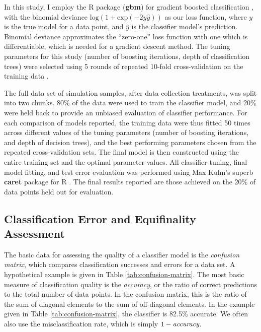 In this study, I employ the R package (\textbf{gbm}) for gradient
boosted classification \citep{ridgeway1999state}, with the binomial deviance \(\textrm{log}(1 + \textrm{exp}(-2y\hat{y}))\) as our loss function, where \(y\) is the true
model for a data point, and \(\hat{y}\) is the classifier model's
prediction.  Binomial deviance approximates the ``zero-one'' loss function with one which is differentiable, which is needed for a gradient descent method.  The tuning parameters for this study (number of boosting iterations, depth of classification trees) were selected using 5 rounds of repeated 10-fold cross-validation on the training data \citep{Kim:2009im, kuhn2013applied}.

The full data set of simulation samples, after data collection treatments, was split into two chunks. 80\% of the data were
used to train the classifier model, and 20\% were held back to provide an
unbiased evaluation of classifier performance.  For each comparison of models
reported, the training data were thus fitted 50 times across
different values of the tuning parameters (number of boosting
iterations, and depth of decision trees), and the best performing
parameters chosen from the repeated cross-validation sets. The final model is then constructed using the entire
training set and the optimal parameter values. All classifier tuning,
final model fitting, and test error evaluation was performed using Max
Kuhn's superb \textbf{caret} package for R
\citep{kuhn2008building, kuhn2013applied}.  The final results reported are those achieved on the 20\% of data points held out for evaluation.


\subsection{Classification Error and Equifinality
Assessment}\label{classification-error-and-equifinality-assessment}


The basic data for assessing the quality of a classifier model is the
\emph{confusion matrix}, which compares classification successes and
errors for a data set.  A hypothetical example is given in Table
\ref{tab:confusion-matrix}.  The most basic measure of classification quality is the \emph{accuracy}, or the ratio
of correct predictions to the total number of data points.  In the confusion matrix, this is the ratio of the sum of diagonal elements to the sum of off-diagonal elements.  In the example given in Table \ref{tab:confusion-matrix}, the classifier is 82.5\% accurate. We often also use the misclassification rate, which is simply $1 - \emph{accuracy}$.  

